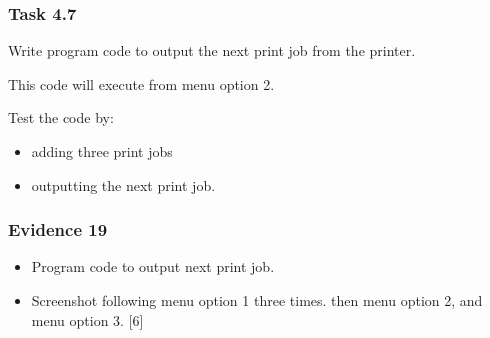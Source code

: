 \subsubsection*{Task 4.7}

Write program code to output the next print job from the printer.

This code will execute from menu option 2.

Test the code by:
\begin{itemize}
\item adding three print jobs
\item outputting the next print job.
\end{itemize}

\subsubsection*{Evidence 19}
\begin{itemize}
\item Program code to output next print job.
\item Screenshot following menu option 1 three times. then menu option 2,
and menu option 3. \hfill{}{[}6{]}
\end{itemize}